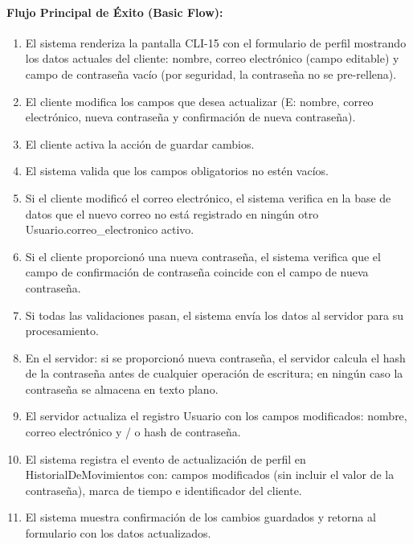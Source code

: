 \paragraph{Flujo Principal de Éxito (Basic Flow):}
\begin{enumerate}
    \item[I.] El sistema renderiza la pantalla CLI-15 con el formulario de perfil mostrando los datos actuales del cliente: nombre, correo electrónico (campo editable) y campo de contraseña vacío (por seguridad, la contraseña no se pre-rellena).
    \item[II.] El cliente modifica los campos que desea actualizar (E: nombre, correo electrónico, nueva contraseña y confirmación de nueva contraseña).
    \item[III.] El cliente activa la acción de guardar cambios.
    \item[IV.] El sistema valida que los campos obligatorios no estén vacíos.
    \item[V.] Si el cliente modificó el correo electrónico, el sistema verifica en la base de datos que el nuevo correo no está registrado en ningún otro Usuario.correo\_electronico activo.
    \item[VI.] Si el cliente proporcionó una nueva contraseña, el sistema verifica que el campo de confirmación de contraseña coincide con el campo de nueva contraseña.
    \item[VII.] Si todas las validaciones pasan, el sistema envía los datos al servidor para su procesamiento.
    \item[VIII.] En el servidor: si se proporcionó nueva contraseña, el servidor calcula el hash de la contraseña antes de cualquier operación de escritura; en ningún caso la contraseña se almacena en texto plano.
    \item[IX.] El servidor actualiza el registro Usuario con los campos modificados: nombre, correo electrónico y / o hash de contraseña.
    \item[X.] El sistema registra el evento de actualización de perfil en HistorialDeMovimientos con: campos modificados (sin incluir el valor de la contraseña), marca de tiempo e identificador del cliente.
    \item[XI.] El sistema muestra confirmación de los cambios guardados y retorna al formulario con los datos actualizados.
\end{enumerate}

